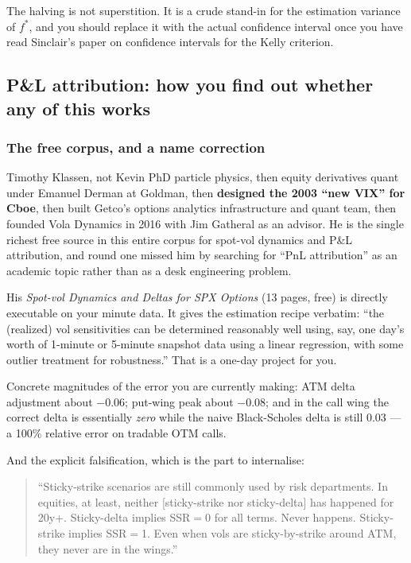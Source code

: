 \documentclass[11pt,a4paper]{article}
\begin{document}
The halving is not superstition. It is a crude stand-in for the estimation
variance of $f^{*}$, and you should replace it with the actual confidence interval
once you have read Sinclair's paper on confidence intervals for the Kelly criterion.

\subsection{P\&L attribution: how you find out whether any of this works}

\subsubsection{The free corpus, and a name correction}

\begin{keyfact}{Timothy Klassen, not Kevin}
PhD particle physics, then equity derivatives quant under Emanuel Derman at
Goldman, then \textbf{designed the 2003 ``new VIX'' for Cboe}, then built Getco's
options analytics infrastructure and quant team, then founded Vola Dynamics in
2016 with Jim Gatheral as an advisor. He is the single richest free source in this
entire corpus for spot-vol dynamics and P\&L attribution, and round one missed him
by searching for ``PnL attribution'' as an academic topic rather than as a desk
engineering problem.
\end{keyfact}

His \emph{Spot-vol Dynamics and Deltas for SPX Options} (13 pages, free) is
directly executable on your minute data. It gives the estimation recipe verbatim:
``the (realized) vol sensitivities can be determined reasonably well using, say,
one day's worth of 1-minute or 5-minute snapshot data using a linear regression,
with some outlier treatment for robustness.'' That is a one-day project for you.

Concrete magnitudes of the error you are currently making: ATM delta adjustment
about $-0.06$; put-wing peak about $-0.08$; and in the call wing the correct delta
is essentially \emph{zero} while the naive Black-Scholes delta is still 0.03 --- a
100\% relative error on tradable OTM calls.

And the explicit falsification, which is the part to internalise:

\begin{quote}\small
``Sticky-strike scenarios are still commonly used by risk departments. In
equities, at least, neither [sticky-strike nor sticky-delta] has happened for
20y+. Sticky-delta implies SSR$=$0 for all terms. Never happens. Sticky-strike
implies SSR$=$1. Even when vols are sticky-by-strike around ATM, they never are in
the wings.''
\end{quote}
\end{document}

